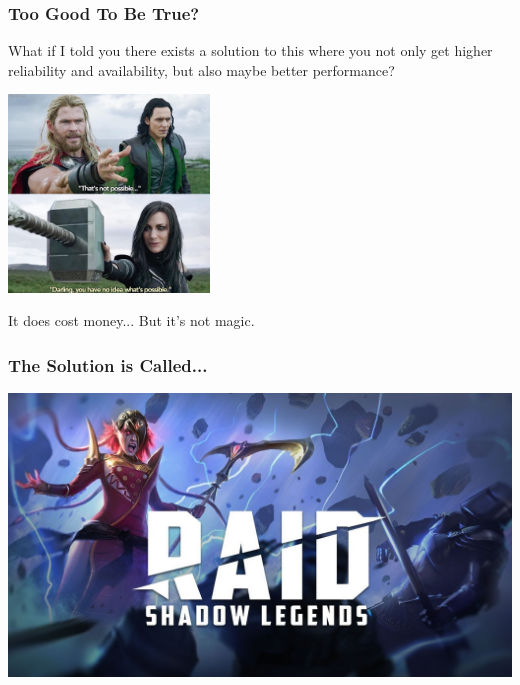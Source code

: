 \begin{frame}
\frametitle{Too Good To Be True?}

 What if I told you there exists a solution to this where you not only get higher reliability and availability, but also maybe better performance?

\begin{center}
	\includegraphics[width=0.4\textwidth]{images/hela.jpg}
\end{center}

It does cost money... But it's not magic.

\end{frame}


\begin{frame}
\frametitle{The Solution is Called...}

\begin{center}
	\includegraphics[width=\textwidth]{images/raid.jpg}
\end{center}

\end{frame}

